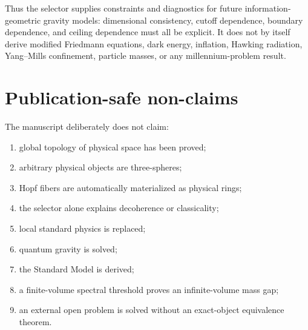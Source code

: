 \documentclass[11pt,a4paper]{article}
\begin{document}
Thus the selector supplies constraints and diagnostics for future information-geometric gravity models: dimensional consistency, cutoff dependence, boundary dependence, and ceiling dependence must all be explicit.  It does not by itself derive modified Friedmann equations, dark energy, inflation, Hawking radiation, Yang--Mills confinement, particle masses, or any millennium-problem result.
\section{Publication-safe non-claims}
\label{sec:non-claims}

The manuscript deliberately does not claim:
\begin{enumerate}
\item global topology of physical space has been proved;
\item arbitrary physical objects are three-spheres;
\item Hopf fibers are automatically materialized as physical rings;
\item the selector alone explains decoherence or classicality;
\item local standard physics is replaced;
\item quantum gravity is solved;
\item the Standard Model is derived;
\item a finite-volume spectral threshold proves an infinite-volume mass gap;
\item an external open problem is solved without an exact-object equivalence theorem.
\end{enumerate}
\end{document}
